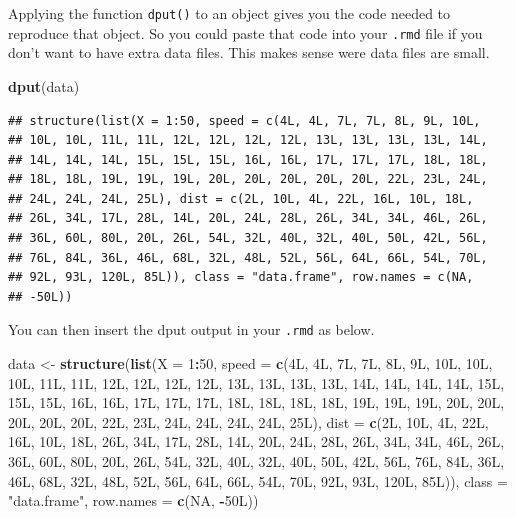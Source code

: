\documentclass[12pt,]{article}
\newenvironment{Shaded}{\begin{snugshade}}{\end{snugshade}}
\newcommand{\KeywordTok}[1]{\textcolor[rgb]{0.13,0.29,0.53}{\textbf{#1}}}
\newcommand{\DataTypeTok}[1]{\textcolor[rgb]{0.13,0.29,0.53}{#1}}
\newcommand{\DecValTok}[1]{\textcolor[rgb]{0.00,0.00,0.81}{#1}}
\newcommand{\StringTok}[1]{\textcolor[rgb]{0.31,0.60,0.02}{#1}}
\newcommand{\OtherTok}[1]{\textcolor[rgb]{0.56,0.35,0.01}{#1}}
\newcommand{\OperatorTok}[1]{\textcolor[rgb]{0.81,0.36,0.00}{\textbf{#1}}}
\newcommand{\NormalTok}[1]{#1}
\theoremstyle{definition}
\theoremstyle{definition}
\theoremstyle{definition}
\theoremstyle{remark}
\begin{document}
Applying the function \texttt{dput()} to an object gives you the code
needed to reproduce that object. So you could paste that code into your
\texttt{.rmd} file if you don't want to have extra data files. This
makes sense were data files are small.

\begin{Shaded}
\begin{Highlighting}[]
\KeywordTok{dput}\NormalTok{(data)}
\end{Highlighting}
\end{Shaded}

\begin{verbatim}
## structure(list(X = 1:50, speed = c(4L, 4L, 7L, 7L, 8L, 9L, 10L, 
## 10L, 10L, 11L, 11L, 12L, 12L, 12L, 12L, 13L, 13L, 13L, 13L, 14L, 
## 14L, 14L, 14L, 15L, 15L, 15L, 16L, 16L, 17L, 17L, 17L, 18L, 18L, 
## 18L, 18L, 19L, 19L, 19L, 20L, 20L, 20L, 20L, 20L, 22L, 23L, 24L, 
## 24L, 24L, 24L, 25L), dist = c(2L, 10L, 4L, 22L, 16L, 10L, 18L, 
## 26L, 34L, 17L, 28L, 14L, 20L, 24L, 28L, 26L, 34L, 34L, 46L, 26L, 
## 36L, 60L, 80L, 20L, 26L, 54L, 32L, 40L, 32L, 40L, 50L, 42L, 56L, 
## 76L, 84L, 36L, 46L, 68L, 32L, 48L, 52L, 56L, 64L, 66L, 54L, 70L, 
## 92L, 93L, 120L, 85L)), class = "data.frame", row.names = c(NA, 
## -50L))
\end{verbatim}

You can then insert the dput output in your \texttt{.rmd} as below.

\begin{Shaded}
\begin{Highlighting}[]
\NormalTok{data <-}\StringTok{ }\KeywordTok{structure}\NormalTok{(}\KeywordTok{list}\NormalTok{(}\DataTypeTok{X =} \DecValTok{1}\OperatorTok{:}\DecValTok{50}\NormalTok{, }\DataTypeTok{speed =} \KeywordTok{c}\NormalTok{(4L, 4L, 7L, 7L, 8L, 9L, 10L, }
\NormalTok{10L, 10L, 11L, 11L, 12L, 12L, 12L, 12L, 13L, 13L, 13L, 13L, 14L, }
\NormalTok{14L, 14L, 14L, 15L, 15L, 15L, 16L, 16L, 17L, 17L, 17L, 18L, 18L, }
\NormalTok{18L, 18L, 19L, 19L, 19L, 20L, 20L, 20L, 20L, 20L, 22L, 23L, 24L, }
\NormalTok{24L, 24L, 24L, 25L), }\DataTypeTok{dist =} \KeywordTok{c}\NormalTok{(2L, 10L, 4L, 22L, 16L, 10L, 18L, }
\NormalTok{26L, 34L, 17L, 28L, 14L, 20L, 24L, 28L, 26L, 34L, 34L, 46L, 26L, }
\NormalTok{36L, 60L, 80L, 20L, 26L, 54L, 32L, 40L, 32L, 40L, 50L, 42L, 56L, }
\NormalTok{76L, 84L, 36L, 46L, 68L, 32L, 48L, 52L, 56L, 64L, 66L, 54L, 70L, }
\NormalTok{92L, 93L, 120L, 85L)), }
\DataTypeTok{class =} \StringTok{"data.frame"}\NormalTok{, }\DataTypeTok{row.names =} \KeywordTok{c}\NormalTok{(}\OtherTok{NA}\NormalTok{, }
\OperatorTok{-}\NormalTok{50L))}
\end{Highlighting}
\end{Shaded}
\end{document}
